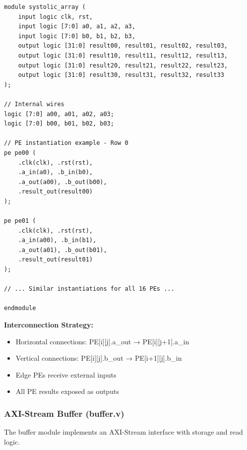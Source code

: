\documentclass[12pt,a4paper]{article}
\begin{document}
\begin{lstlisting}[style=verilog,caption={Systolic Array - 4x4 Grid (Excerpt)},label={lst:array}]
module systolic_array (
    input logic clk, rst,
    input logic [7:0] a0, a1, a2, a3,
    input logic [7:0] b0, b1, b2, b3,
    output logic [31:0] result00, result01, result02, result03,
    output logic [31:0] result10, result11, result12, result13,
    output logic [31:0] result20, result21, result22, result23,
    output logic [31:0] result30, result31, result32, result33
);

// Internal wires
logic [7:0] a00, a01, a02, a03;
logic [7:0] b00, b01, b02, b03;

// PE instantiation example - Row 0
pe pe00 (
    .clk(clk), .rst(rst),
    .a_in(a0), .b_in(b0),
    .a_out(a00), .b_out(b00),
    .result_out(result00)
);

pe pe01 (
    .clk(clk), .rst(rst),
    .a_in(a00), .b_in(b1),
    .a_out(a01), .b_out(b01),
    .result_out(result01)
);

// ... Similar instantiations for all 16 PEs ...

endmodule
\end{lstlisting}

\textbf{Interconnection Strategy:}
\begin{itemize}
    \item Horizontal connections: PE[i][j].a\_out → PE[i][j+1].a\_in
    \item Vertical connections: PE[i][j].b\_out → PE[i+1][j].b\_in
    \item Edge PEs receive external inputs
    \item All PE results exposed as outputs
\end{itemize}

\newpage

\subsubsection{AXI-Stream Buffer (buffer.v)}

The buffer module implements an AXI-Stream interface with storage and read logic.
\end{document}
